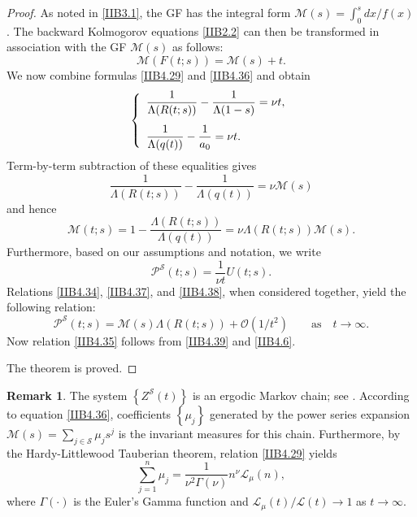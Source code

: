 \documentclass[10pt,reqno]{amsart}
\theoremstyle{definition}
\newtheorem{remark}{Remark}
\numberwithin{equation}{section}
\begin{document}
\begin{proof}
     As noted in {\eqref{IIB3.1}}, the GF has the integral form $\mathcal{M}(s)=\int_{0}^{s}{{dx}/{f(x)}}$.
    The backward Kolmogorov equations {\eqref{IIB2.2}} can then be transformed in association with the GF $\mathcal{M}(s)$ as follows:
\begin{equation}                  \label{IIB4.36}
    \mathcal{M}\left(F(t;s)\right)=\mathcal{M}(s)+t.
\end{equation}
    We now combine formulas {\eqref{IIB4.29}} and {\eqref{IIB4.36}} and obtain
\begin{align*}
\left\{
\begin{array}{l}
    \displaystyle \frac{1}{\Lambda (R(t;s))}-\frac{1}{\Lambda (1-s)}=\nu{t},
\vspace{2.8mm}  \\
    \displaystyle \frac{1}{\Lambda (q(t))}-\frac{1}{{{a}_{0}}}=\nu{t}.  \\
\end{array}
\right.
\end{align*}
    Term-by-term subtraction of these equalities gives
\[
    \frac{1}{\Lambda(R(t;s))}-\frac{1}{\Lambda(q(t))}=\nu\mathcal{M}(s)
\]
    and hence
\begin{equation}                  \label{IIB4.37}
    \mathcal{M}(t;s)=1-\frac{\Lambda\left(R(t;s)\right)}{\Lambda(q(t))}=\nu\Lambda(R(t;s))\mathcal{M}(s).
\end{equation}
    Furthermore, based on our assumptions and notation, we write
\begin{equation}                  \label{IIB4.38}
{{\mathcal{P}}^{\mathcal{S}}}(t;s)={\frac{1}{\nu{t}}}U(t;s).
\end{equation}
    Relations {\eqref{IIB4.34}}, {\eqref{IIB4.37}}, and {\eqref{IIB4.38}}, when considered together,
    yield the following relation:
\begin{equation}                  \label{IIB4.39}
    {{\mathcal{P}}^{\mathcal{S}}}(t;s)=\mathcal{M}(s)\Lambda(R(t;s))+\mathcal{O}\left({1}\big/{{{t}^{2}}}\right)
    \qquad {\text{as}} \quad {t\to\infty}.
\end{equation}
    Now relation {\eqref{IIB4.35}} follows from {\eqref{IIB4.39}} and {\eqref{IIB4.6}}.

    The theorem is proved.
\end{proof}

\begin{remark}                  \label{IIBRem5}
      The system $\left\{{{Z}^{\mathcal{S}}}(t)\right\}$ is an ergodic Markov chain; see {\cite{ImIJSA14}}. According
      to equation {\eqref{IIB4.36}}, coefficients $\left\{{{\mu}_{j}}\right\}$ generated by the power series
      expansion $\mathcal{M}(s)=\sum_{j\in\mathcal{S}}{{{\mu}_{j}}{{s}^{j}}}$ is the invariant measures for
      this chain. Furthermore, by the Hardy-Littlewood Tauberian theorem, relation {\eqref{IIB4.29}} yields
\[
    \sum_{j=1}^{n}{{{\mu}_{j}}}=\frac{1}{{{\nu}^{2}}\Gamma(\nu)}{{n}^{\nu}}{{\mathcal{L}}_{\mu}}(n),
\]
    where $\Gamma(\cdot)$ is the Euler's Gamma function and ${{{\mathcal{L}}_{\mu}}(t)}/{\mathcal{L}(t)}\to{1}$ as $t\to\infty$.
\end{remark}
\end{document}
